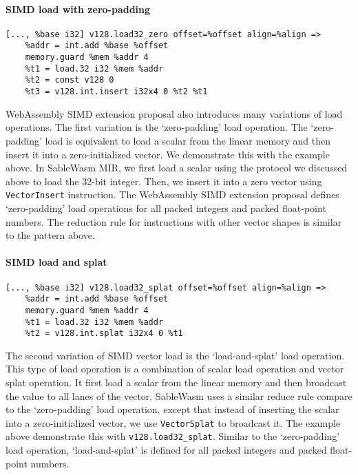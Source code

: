 \paragraph{SIMD load with zero-padding} \quad
\begin{lstlisting}[basicstyle=\linespread{0.8}\small, language=SableWasmMIR]
[..., %base i32] v128.load32_zero offset=%offset align=%align =>
    %addr = int.add %base %offset
    memory.guard %mem %addr 4
    %t1 = load.32 i32 %mem %addr
    %t2 = const v128 0
    %t3 = v128.int.insert i32x4 0 %t2 %t1
\end{lstlisting}
WebAssembly SIMD extension proposal also introduces many variations of load operations. The first variation is the `zero-padding' load operation. The `zero-padding' load is equivalent to load a scalar from the linear memory and then insert it into a zero-initialized vector. We demonstrate this with the example above. In SableWasm MIR, we first load a scalar using the protocol we discussed above to load the 32-bit integer. Then, we insert it into a zero vector using \texttt{VectorInsert} instruction. The WebAssembly SIMD extension proposal defines `zero-padding' load operations for all packed integers and packed float-point numbers. The reduction rule for instructions with other vector shapes is similar to the pattern above.

\paragraph{SIMD load and splat} \quad
\begin{lstlisting}[basicstyle=\linespread{0.8}\small, language=SableWasmMIR]
[..., %base i32] v128.load32_splat offset=%offset align=%align =>
    %addr = int.add %base %offset
    memory.guard %mem %addr 4
    %t1 = load.32 i32 %mem %addr
    %t2 = v128.int.splat i32x4 0 %t1
\end{lstlisting}
The second variation of SIMD vector load is the `load-and-splat' load operation. This type of load operation is a combination of scalar load operation and vector splat operation. It first load a scalar from the linear memory and then broadcast the value to all lanes of the vector. SableWasm uses a similar reduce rule compare to the `zero-padding' load operation, except that instead of inserting the scalar into a zero-initialized vector, we use \texttt{VectorSplat} to broadcast it. The example above demonstrate this with \texttt{v128.load32\_splat}. Similar to the `zero-padding' load operation, `load-and-splat' is defined for all packed integers and packed float-point numbers.

